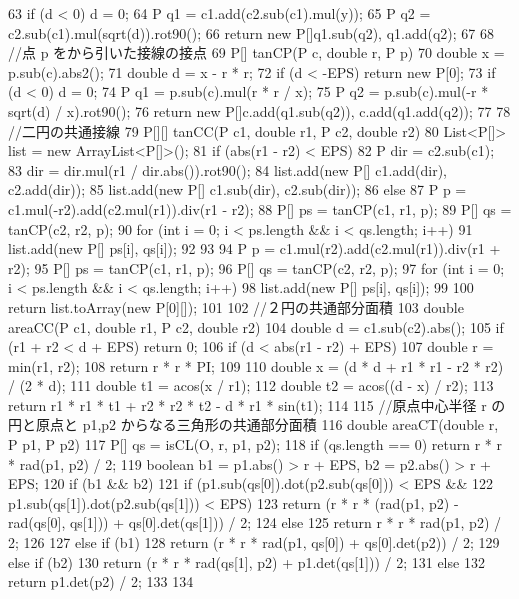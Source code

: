 \documentclass[11pt]{article}
\begin{document}
\begin{Code}
{63 if (d < 0) d = 0;
64 P q1 = c1.add(c2.sub(c1).mul(y));
65 P q2 = c2.sub(c1).mul(sqrt(d)).rot90();
66 return new P[]{q1.sub(q2), q1.add(q2)};
67 }
68 //点 p をから引いた接線の接点
69 P[] tanCP(P c, double r, P p) {
70 double x = p.sub(c).abs2();
71 double d = x - r * r;
72 if (d < -EPS) return new P[0];
73 if (d < 0) d = 0;
74 P q1 = p.sub(c).mul(r * r / x);
75 P q2 = p.sub(c).mul(-r * sqrt(d) / x).rot90();
76 return new P[]{c.add(q1.sub(q2)), c.add(q1.add(q2))};
77 }
78 //二円の共通接線
79 P[][] tanCC(P c1, double r1, P c2, double r2) {
80 List<P[]> list = new ArrayList<P[]>();
81 if (abs(r1 - r2) < EPS) {
82 P dir = c2.sub(c1);
83 dir = dir.mul(r1 / dir.abs()).rot90();
84 list.add(new P[] {c1.add(dir), c2.add(dir)});
85 list.add(new P[] {c1.sub(dir), c2.sub(dir)});
86 } else {
87 P p = c1.mul(-r2).add(c2.mul(r1)).div(r1 - r2);
88 P[] ps = tanCP(c1, r1, p);
89 P[] qs = tanCP(c2, r2, p);
90 for (int i = 0; i < ps.length && i < qs.length; i++) {
91 list.add(new P[] {ps[i], qs[i]});
92 }
93 }
94 P p = c1.mul(r2).add(c2.mul(r1)).div(r1 + r2);
95 P[] ps = tanCP(c1, r1, p);
96 P[] qs = tanCP(c2, r2, p);
97 for (int i = 0; i < ps.length && i < qs.length; i++) {
98 list.add(new P[] {ps[i], qs[i]});
99 }
100 return list.toArray(new P[0][]);
101 }
102 //２円の共通部分面積
103 double areaCC(P c1, double r1, P c2, double r2) {
104 double d = c1.sub(c2).abs();
105 if (r1 + r2 < d + EPS) return 0;
106 if (d < abs(r1 - r2) + EPS) {
107 double r = min(r1, r2);
108 return r * r * PI;
109 }
110 double x = (d * d + r1 * r1 - r2 * r2) / (2 * d);
111 double t1 = acos(x / r1);
112 double t2 = acos((d - x) / r2);
113 return r1 * r1 * t1 + r2 * r2 * t2 - d * r1 * sin(t1);
114 }
115 //原点中心半径 r の円と原点と p1,p2 からなる三角形の共通部分面積
116 double areaCT(double r, P p1, P p2) {
117 P[] qs = isCL(O, r, p1, p2);
118 if (qs.length == 0) return r * r * rad(p1, p2) / 2;
119 boolean b1 = p1.abs() > r + EPS, b2 = p2.abs() > r + EPS;
120 if (b1 && b2) {
121 if (p1.sub(qs[0]).dot(p2.sub(qs[0])) < EPS &&
122 p1.sub(qs[1]).dot(p2.sub(qs[1])) < EPS) {
123 return (r * r * (rad(p1, p2) - rad(qs[0], qs[1])) + qs[0].det(qs[1])) / 2;
124 } else {
125 return r * r * rad(p1, p2) / 2;
126 }
127 } else if (b1) {
128 return (r * r * rad(p1, qs[0]) + qs[0].det(p2)) / 2;
129 } else if (b2) {
130 return (r * r * rad(qs[1], p2) + p1.det(qs[1])) / 2;
131 } else {
132 return p1.det(p2) / 2;
133 }
134 }
\end{Code}
\end{document}
